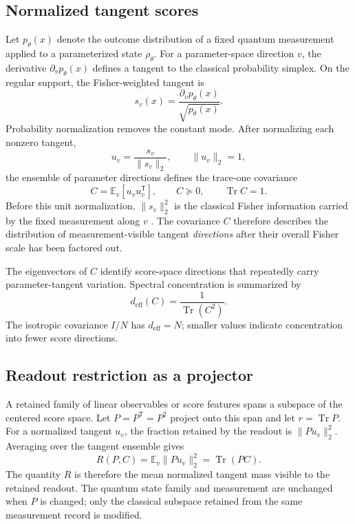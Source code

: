 \documentclass[ASNA,twocolumn]{USG}
\begin{document}
\subsection{Normalized tangent scores}

Let $p_\theta(x)$ denote the outcome distribution of a fixed quantum measurement applied to a parameterized state $\rho_\theta$. For a parameter-space direction $v$, the derivative $\partial_v p_\theta(x)$ defines a tangent to the classical probability simplex. On the regular support, the Fisher-weighted tangent is
\begin{equation}
 s_v(x)=\frac{\partial_v p_\theta(x)}{\sqrt{p_\theta(x)}}.
\label{eq:aqt-score}
\end{equation}
Probability normalization removes the constant mode. After normalizing each nonzero tangent,
\begin{equation}
 u_v=\frac{s_v}{\|s_v\|_2},
\qquad \|u_v\|_2=1,
\end{equation}
the ensemble of parameter directions defines the trace-one covariance
\begin{equation}
 C=\mathbb E_v[u_vu_v^{\mathsf T}],
\qquad C\succeq0,
\qquad \operatorname{Tr}C=1.
\label{eq:aqt-C}
\end{equation}
Before this unit normalization, $\|s_v\|_2^2$ is the classical Fisher information carried by the fixed measurement along $v$ \cite{BraunsteinCaves1994,LuLuoOh2012}. The covariance $C$ therefore describes the distribution of measurement-visible tangent \emph{directions} after their overall Fisher scale has been factored out.

The eigenvectors of $C$ identify score-space directions that repeatedly carry parameter-tangent variation. Spectral concentration is summarized by
\begin{equation}
 d_{\mathrm{eff}}(C)=\frac{1}{\operatorname{Tr}(C^2)}.
\label{eq:aqt-deff}
\end{equation}
The isotropic covariance $I/N$ has $d_{\mathrm{eff}}=N$; smaller values indicate concentration into fewer score directions.

\subsection{Readout restriction as a projector}

A retained family of linear observables or score features spans a subspace of the centered score space. Let $P=P^{\mathsf T}=P^2$ project onto this span and let $r=\operatorname{Tr}P$. For a normalized tangent $u_v$, the fraction retained by the readout is $\|Pu_v\|_2^2$. Averaging over the tangent ensemble gives
\begin{equation}
 R(P,C)=\mathbb E_v\|Pu_v\|_2^2
       =\operatorname{Tr}(PC).
\label{eq:aqt-retention}
\end{equation}
The quantity $R$ is therefore the mean normalized tangent mass visible to the retained readout. The quantum state family and measurement are unchanged when $P$ is changed; only the classical subspace retained from the same measurement record is modified.
\end{document}
